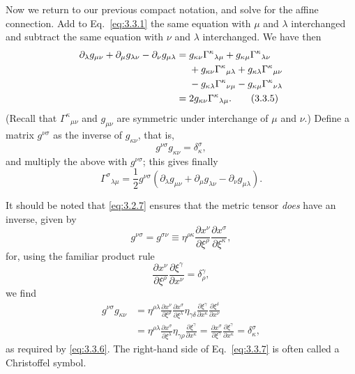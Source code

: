 Now we return to our previous compact notation, and solve for the affine
connection. Add to Eq.~\eqref{eq:3.3.1} the same equation with $\mu$ and
$\lambda$ interchanged and subtract the same equation with $\nu$ and
$\lambda$ interchanged. We have then
\begin{align}
  \partial_\lambda g_{\mu\nu}
  +\partial_\mu g_{\lambda\nu}
  -\partial_\nu g_{\mu\lambda}
  ={}&
  g_{\kappa\nu}\Gamma^\kappa{}_{\lambda\mu}
  +g_{\kappa\mu}\Gamma^\kappa{}_{\lambda\nu}
  \notag\\
  &+g_{\kappa\nu}\Gamma^\kappa{}_{\mu\lambda}
  +g_{\kappa\lambda}\Gamma^\kappa{}_{\mu\nu}
  \notag\\
  &-g_{\kappa\lambda}\Gamma^\kappa{}_{\nu\mu}
  -g_{\kappa\mu}\Gamma^\kappa{}_{\nu\lambda}
  \notag\\
  ={}&2g_{\kappa\nu}\Gamma^\kappa{}_{\lambda\mu}.
  \tag{3.3.5}\label{eq:3.3.5}
\end{align}
(Recall that $\Gamma^\kappa{}_{\mu\nu}$ and $g_{\mu\nu}$ are symmetric under
interchange of $\mu$ and $\nu$.) Define a matrix $g^{\nu\sigma}$ as the
inverse of $g_{\kappa\nu}$, that is,
\begin{equation}
  g^{\nu\sigma}g_{\kappa\nu}=\delta^\sigma_\kappa,
  \tag{3.3.6}\label{eq:3.3.6}
\end{equation}
and multiply the above with $g^{\nu\sigma}$; this gives finally
\begin{equation}
  \Gamma^\sigma{}_{\lambda\mu}
  =\frac12g^{\nu\sigma}
  \left(\partial_\lambda g_{\mu\nu}
  +\partial_\mu g_{\lambda\nu}
  -\partial_\nu g_{\mu\lambda}\right).
  \tag{3.3.7}\label{eq:3.3.7}
\end{equation}

It should be noted that \eqref{eq:3.2.7} ensures that the metric tensor
\emph{does} have an inverse, given by
\begin{equation}
  g^{\nu\sigma}=g^{\sigma\nu}
  \equiv
  \eta^{\rho\kappa}
  \frac{\partial x^\nu}{\partial\xi^\rho}
  \frac{\partial x^\sigma}{\partial\xi^\kappa},
  \tag{3.3.8}\label{eq:3.3.8}
\end{equation}
for, using the familiar product rule
\[
  \frac{\partial x^\nu}{\partial\xi^\rho}
  \frac{\partial\xi^\gamma}{\partial x^\nu}
  =\delta^\gamma_\rho,
\]
we find
\begin{align*}
  g^{\nu\sigma}g_{\kappa\nu}
  &=
  \eta^{\rho\lambda}
  \frac{\partial x^\nu}{\partial\xi^\rho}
  \frac{\partial x^\sigma}{\partial\xi^\lambda}
  \eta_{\gamma\delta}
  \frac{\partial\xi^\gamma}{\partial x^\kappa}
  \frac{\partial\xi^\delta}{\partial x^\nu}
  \\
  &=
  \eta^{\rho\lambda}
  \frac{\partial x^\sigma}{\partial\xi^\lambda}
  \eta_{\gamma\rho}
  \frac{\partial\xi^\gamma}{\partial x^\kappa}
  =
  \frac{\partial x^\sigma}{\partial\xi^\gamma}
  \frac{\partial\xi^\gamma}{\partial x^\kappa}
  =\delta^\sigma_\kappa,
\end{align*}
as required by \eqref{eq:3.3.6}. The right-hand side of
Eq.~\eqref{eq:3.3.7} is often called a Christoffel symbol.

